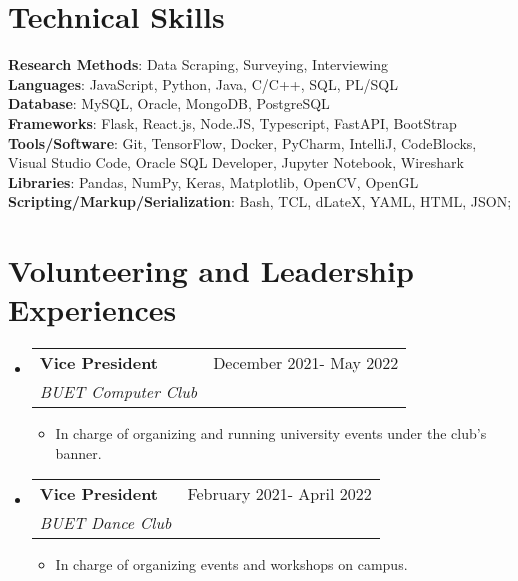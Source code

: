 \documentclass[letterpaper,12pt]{article}
\makeatletter
\newcommand{\resumeItem}[1]{
  \item\small{
    {#1 \vspace{-2pt}}
  }
}
\newcommand{\resumeSubheading}[4]{
  \vspace{-2pt}\item
    \begin{tabular*}{0.97\textwidth}[t]{l@{\extracolsep{\fill}}r}
      \textbf{#1} & #2 \\
      \textit{\small#3} & \textit{\small #4} \\
    \end{tabular*}\vspace{-7pt}
}
\newcommand{\resumeSubHeadingListStart}{\begin{itemize}[leftmargin=0.15in, label={}]}
\newcommand{\resumeSubHeadingListEnd}{\end{itemize}}
\newcommand{\resumeItemListStart}{\begin{itemize}}
\newcommand{\resumeItemListEnd}{\end{itemize}\vspace{-5pt}}
\makeatother
\begin{document}
\section{Technical Skills}
 \begin{itemize}[leftmargin=0.15in, label={}]
    \small{\item{
     \textbf{Research Methods}{: Data Scraping, Surveying, Interviewing} \\
     \textbf{Languages}{: JavaScript, Python, Java, C/C++, SQL, PL/SQL} \\
     \textbf{Database}{: MySQL, Oracle, MongoDB, PostgreSQL}\\
     \textbf{Frameworks}{:  Flask, React.js, Node.JS, Typescript, FastAPI, BootStrap } \\
     \textbf{Tools/Software}{: Git, TensorFlow, Docker, PyCharm, IntelliJ, CodeBlocks, Visual Studio Code, Oracle SQL Developer, Jupyter Notebook, Wireshark} \\
     \textbf{Libraries}{: Pandas, NumPy, Keras, Matplotlib, OpenCV, OpenGL}\\
     \textbf{Scripting/Markup/Serialization}{: Bash, TCL, dLateX, YAML, HTML, JSON};\\
     
    }}
 \end{itemize}



\section{Volunteering and Leadership Experiences}
  \resumeSubHeadingListStart
    \resumeSubheading
      {Vice President}{December 2021- May 2022}
      {BUET Computer Club}{}
\resumeItemListStart
      \resumeItem{In charge of organizing and running university events under the club's banner.}
    \resumeItemListEnd
      \resumeSubheading
      {Vice President}{February 2021- April 2022}
      {BUET Dance Club}{}
\resumeItemListStart
      \resumeItem{In charge of organizing events and workshops on campus.}
    \resumeItemListEnd
      

  \resumeSubHeadingListEnd
  
      
\end{document}
